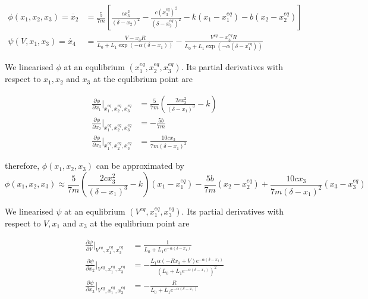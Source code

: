 \documentclass[a4paper,10pt,reqno]{amsart}
\numberwithin{equation}{section}
\begin{document}
\begin{subequations}
    \begin{align}
         \phi(x_1, x_2, x_3) = \dot{x_2} &= \frac{5}{7m}\left[\frac{cx_3^2}{(\delta - x_2)^2} - \frac{c(x_3^{eq})^2}{(\delta - x_2^{eq})^2} - k(x_1 - x_1^{eq}) - b(x_2 - x_2^{eq})\right] \\
         \psi(V, x_1, x_3) = \dot{x_4} &= \frac{V - x_3R}{L_0 + L_1\exp(-\alpha(\delta - x_1))} - \frac{V^{eq} - x_3^{eq}R}{L_0 + L_1\exp(-\alpha(\delta - x_1^{eq}))}
    \end{align}
\end{subequations}

We linearised $\phi$ at an equlibrium $(x_1^{eq}, x_2^{eq}, x_3^{eq})$. Its partial derivatives with respect to $x_1, x_2$ and $x_3$ at the equlibrium point are

\begin{subequations}
     \begin{align}
          \frac{\partial\phi}{\partial x_1}\Bigg|_{x_1^{eq}, x_2^{eq}, x_3^{eq}} &= \frac{5}{7 m}\left(\frac{2 c x_{3}^{2}}{\left(\delta - x_{1}\right)^{3}} - k\right) \\
          \frac{\partial\phi}{\partial x_2}\Bigg|_{x_1^{eq}, x_2^{eq}, x_3^{eq}} &= - \frac{5 b}{7 m} \\
          \frac{\partial\phi}{\partial x_3}\Bigg|_{x_1^{eq}, x_2^{eq}, x_3^{eq}} &= \frac{10 c x_{3}}{7 m \left(\delta - x_{1}\right)^{2}}
     \end{align}
\end{subequations}

therefore, $\phi(x_1, x_2, x_3)$ can be approximated by
\begin{equation}
     \phi(x_1, x_2, x_3) \approx \frac{5}{7 m}\left(\frac{2 c x_{3}^{2}}{\left(\delta - x_{1}\right)^{3}} - k\right)(x_1 - x_1^{eq}) - \frac{5 b}{7 m}(x_2 - x_2^{eq}) + \frac{10 c x_{3}}{7 m \left(\delta - x_{1}\right)^{2}}(x_3 - x_3^{eq})
\end{equation}

We linearised $\psi$ at an equlibrium $(V^{eq}, x_1^{eq}, x_3^{eq})$. Its partial derivatives with respect to $V, x_1$ and $x_3$ at the equlibrium point are

\begin{subequations}
     \begin{align}
        \frac{\partial\psi}{\partial V}\Bigg|_{V^{eq}, x_1^{eq}, x_3^{eq}} &= \frac{1}{L_{0} + L_{1} e^{- \alpha \left(\delta - x_{1}\right)}} \\
          \frac{\partial\psi}{\partial x_2}\Bigg|_{V^{eq}, x_1^{eq}, x_3^{eq}} &= - \frac{L_{1} \alpha \left(- R x_{3} + V\right) e^{- \alpha \left(\delta - x_{1}\right)}}{\left(L_{0} + L_{1} e^{- \alpha \left(\delta - x_{1}\right)}\right)^{2}} \\
          \frac{\partial\psi}{\partial x_3}\Bigg|_{V^{eq}, x_1^{eq}, x_3^{eq}} &= - \frac{R}{L_{0} + L_{1} e^{- \alpha \left(\delta - x_{1}\right)}}
     \end{align}
\end{subequations}
\end{document}
